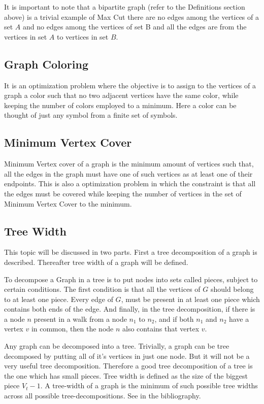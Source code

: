 It is important to note that a bipartite graph (refer to the Definitions
section above) is a trivial example of Max Cut there are no edges among the
vertices of a set $A$ and no edges among the vertices of set B and all the edges
are from the vertices in set $A$ to vertices in set $B$.

\subsection{Graph Coloring}
It is an optimization problem where the objective is to assign to the vertices
of a graph a color such that no two adjacent vertices have the same color,
while keeping the number of colors employed to a minimum. Here a color can be
thought of just any symbol from a finite set of symbols.

\subsection{Minimum Vertex Cover}
Minimum Vertex cover of a graph is the minimum amount of vertices such that,
all the edges in the graph must have one of such vertices as at least one of
their endpoints. This is also a optimization problem in which the constraint is
that all the edges must be covered while keeping the number of vertices in the
set of Minimum Vertex Cover to the minimum.

\subsection{Tree Width}
\label{explanation: treewidth}
This topic will be discussed in two parts. First a tree decomposition of a
graph is described. Thereafter tree width of a graph will be defined.

To decompose a Graph in a tree is to put nodes into sets called pieces, subject
to certain conditions.  The first condition is that all the vertices of $G$
should belong to at least one piece. Every edge of $G$, must be present in
at least one piece which contains both ends of the edge.  And finally, in the
tree decomposition, if there is a node $n$ present in a walk from a node $n_1$
to $n_2$, and if both $n_1$ and $n_2$ have a vertex $v$ in common, then the node
$n$ also contains that vertex $v$. 

Any graph can be decomposed into a tree. Trivially, a graph can be tree
decomposed by putting all of it's vertices in just one node. But it will not be
a very useful tree decomposition.  Therefore a good tree decomposition of a
tree is the one which has small pieces.  Tree width is defined as the size of
the biggest piece $V_t - 1$. A tree-width of a graph is the minimum of such
possible tree widths across all possible tree-decompositions. See
\cite{KleinbergTardos06} in the bibliography.

